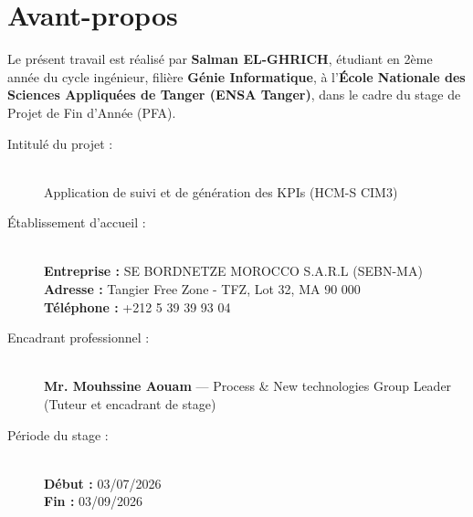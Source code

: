 \chapter*{Avant-propos}
\large \noindent
Le présent travail est réalisé par \textbf{Salman EL-GHRICH}, étudiant en 2ème année du cycle ingénieur, filière \textbf{Génie Informatique}, à l'\textbf{École Nationale des Sciences Appliquées de Tanger (ENSA Tanger)}, dans le cadre du stage de Projet de Fin d'Année (PFA).

\vspace{1cm}

\begin{description}
    \item[\Large Intitulé du projet :] \hfill \\
    \vspace{0.2cm}
    Application de suivi et de génération des KPIs (HCM-S CIM3)
    
    \vspace{1.5cm}
    
    \item[\Large Établissement d'accueil :] \hfill \\
    \textbf{Entreprise :} SE BORDNETZE MOROCCO S.A.R.L (SEBN-MA)\\
    \textbf{Adresse :} Tangier Free Zone - TFZ, Lot 32, MA 90 000\\
    \textbf{Téléphone :} +212 5 39 39 93 04
    
    
    \vspace{1.5cm}
    \item[\Large Encadrant professionnel :] \hfill \\
    \textbf{Mr. Mouhssine Aouam} — Process & New technologies Group Leader (Tuteur et encadrant de stage)
    
    \vspace{1.5cm}
    
    \item[\Large Période du stage :] \hfill \\
    \textbf{Début :} 03/07/2026 \\
    \textbf{Fin :} 03/09/2026
\end{description}
